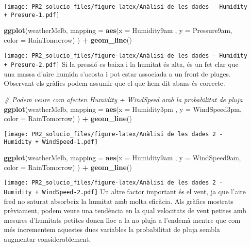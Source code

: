 \documentclass[
]{article}
\newenvironment{Shaded}{\begin{snugshade}}{\end{snugshade}}
\newcommand{\CommentTok}[1]{\textcolor[rgb]{0.56,0.35,0.01}{\textit{#1}}}
\newcommand{\DataTypeTok}[1]{\textcolor[rgb]{0.13,0.29,0.53}{#1}}
\newcommand{\KeywordTok}[1]{\textcolor[rgb]{0.13,0.29,0.53}{\textbf{#1}}}
\newcommand{\NormalTok}[1]{#1}
\newcommand{\OperatorTok}[1]{\textcolor[rgb]{0.81,0.36,0.00}{\textbf{#1}}}
\newcommand{\StringTok}[1]{\textcolor[rgb]{0.31,0.60,0.02}{#1}}
\begin{document}
\texttt{[image: PR2\_solucio\_files/figure-latex/Anàlisi de les dades - Humidity + Presure-1.pdf]}

\begin{Shaded}
\begin{Highlighting}[]
\KeywordTok{ggplot}\NormalTok{(weatherMelb, }\DataTypeTok{mapping =} \KeywordTok{aes}\NormalTok{(}\DataTypeTok{x =}\NormalTok{ Humidity9am , }\DataTypeTok{y =}\NormalTok{ Pressure9am, }\DataTypeTok{color =}\NormalTok{ RainTomorrow) ) }\OperatorTok{+}\StringTok{ }\KeywordTok{geom_line}\NormalTok{()}
\end{Highlighting}
\end{Shaded}

\texttt{[image: PR2\_solucio\_files/figure-latex/Anàlisi de les dades - Humidity + Presure-2.pdf]}
Si la pressió es baixa i la humitat és alta, és un fet clar que una
massa d'aire humida s'acosta i pot estar associada a un front de pluges.
Observant els gràfics podem assumir que el que hem dit abans és
correcte.

\begin{Shaded}
\begin{Highlighting}[]
\CommentTok{# Podem veure com afecten Humidity + WindSpeed amb la probabilitat de pluja}
\KeywordTok{ggplot}\NormalTok{(weatherMelb, }\DataTypeTok{mapping =} \KeywordTok{aes}\NormalTok{(}\DataTypeTok{x =}\NormalTok{ Humidity3pm , }\DataTypeTok{y =}\NormalTok{ WindSpeed3pm, }\DataTypeTok{color =}\NormalTok{ RainTomorrow) ) }\OperatorTok{+}\StringTok{ }\KeywordTok{geom_line}\NormalTok{()}
\end{Highlighting}
\end{Shaded}

\texttt{[image: PR2\_solucio\_files/figure-latex/Anàlisi de les dades 2 - Humidity + WindSpeed-1.pdf]}

\begin{Shaded}
\begin{Highlighting}[]
\KeywordTok{ggplot}\NormalTok{(weatherMelb, }\DataTypeTok{mapping =} \KeywordTok{aes}\NormalTok{(}\DataTypeTok{x =}\NormalTok{ Humidity9am , }\DataTypeTok{y =}\NormalTok{ WindSpeed9am, }\DataTypeTok{color =}\NormalTok{ RainTomorrow) ) }\OperatorTok{+}\StringTok{ }\KeywordTok{geom_line}\NormalTok{()}
\end{Highlighting}
\end{Shaded}

\texttt{[image: PR2\_solucio\_files/figure-latex/Anàlisi de les dades 2 - Humidity + WindSpeed-2.pdf]}
Un altre factor important és el vent, ja que l'aire fred no saturat
absorbeix la humitat amb molta eficàcia. Als gràfics mostrats
prèviament, podem veure una tendència en la qual velocitats de vent
petites amb mesures d'humitats petites donen lloc a la no pluja a
l'endemà mentre que com més incrementem aquestes dues variables la
probabilitat de pluja sembla augmentar considerablement.
\end{document}
